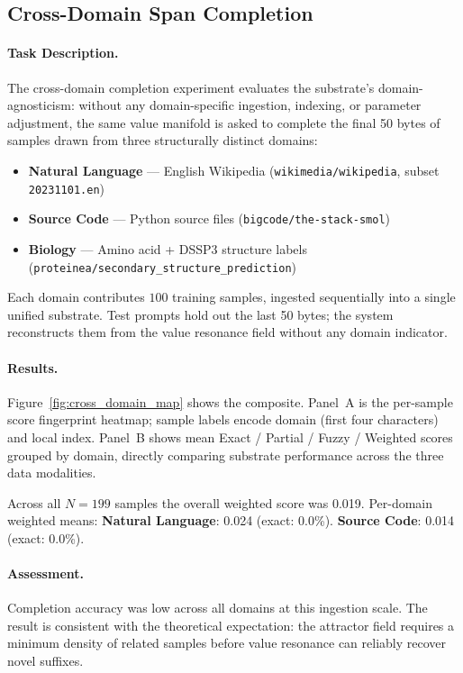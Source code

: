 \subsection{Cross-Domain Span Completion}
\label{sec:cross_domain_completion}

\paragraph{Task Description.}
The cross-domain completion experiment evaluates the substrate's
domain-agnosticism: without any domain-specific ingestion, indexing,
or parameter adjustment, the same value manifold is asked to complete
the final 50 bytes of samples drawn from three structurally distinct
domains:

\begin{itemize}[nosep]
  \item \textbf{Natural Language} --- English Wikipedia
        (\texttt{wikimedia/wikipedia}, subset \texttt{20231101.en})
  \item \textbf{Source Code} --- Python source files
        (\texttt{bigcode/the-stack-smol})
  \item \textbf{Biology} --- Amino acid + DSSP3 structure labels
        (\texttt{proteinea/secondary\_structure\_prediction})
\end{itemize}

Each domain contributes $100$ training samples,
ingested sequentially into a single unified substrate.
Test prompts hold out the last 50 bytes; the system reconstructs
them from the value resonance field without any domain indicator.

\paragraph{Results.}
Figure~\ref{fig:cross_domain_map} shows the composite.
Panel~A is the per-sample score fingerprint heatmap; sample labels
encode domain (first four characters) and local index.
Panel~B shows mean Exact / Partial / Fuzzy / Weighted scores grouped
by domain, directly comparing substrate performance across the
three data modalities.

Across all $N = 199$ samples the overall weighted score was
0.019. Per-domain weighted means:
\textbf{Natural Language}: 0.024 (exact: 0.0\%).
\textbf{Source Code}: 0.014 (exact: 0.0\%).

\paragraph{Assessment.}
Completion accuracy was low across all domains at this ingestion
scale.  The result is consistent with the theoretical expectation:
the attractor field requires a minimum density of related samples
before value resonance can reliably recover novel suffixes.
